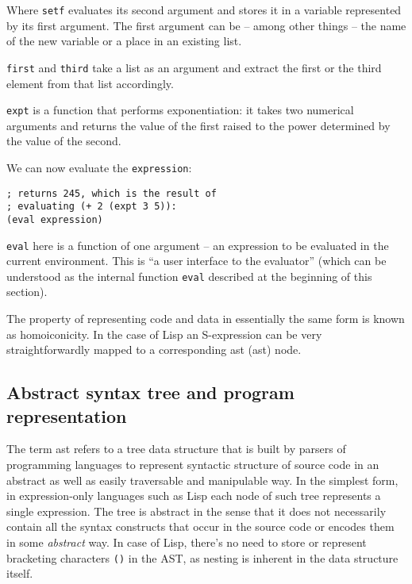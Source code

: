 Where \texttt{setf} evaluates its second argument and stores it in a variable represented by its first argument. The first argument can be -- among other things\cite[Section~11.15.1]{emacs_lisp_reference} -- the name of the new variable or a place in an existing list. 

\texttt{first} and \texttt{third} take a list as an argument and extract the first or the third element from that list accordingly.

\texttt{expt} is a function that performs exponentiation: it takes two numerical arguments and returns the value of the first raised to the power determined by the value of the second.

We can now evaluate the \texttt{expression}:
\begin{lstlisting}
; returns 245, which is the result of
; evaluating (+ 2 (expt 3 5)):
(eval expression)
\end{lstlisting}

\texttt{eval} here is a function of one argument -- an expression to be evaluated in the current environment. This is ``a user interface to the evaluator''\cite[Section~3.8, Function~EVAL]{common_lisp_hyperspec} (which can be understood as the internal function \texttt{eval} described at the beginning of this section).

The property of representing code and data in essentially the same form is known as homoiconicity\cite{homoiconicity_wikipedia, c2_homoiconicity, homoiconicity}. In the case of Lisp an S-expression can be very straightforwardly mapped to a corresponding \acrlong{ast} (\acrshort{ast}) node.


\subsection{Abstract syntax tree and program representation}
The term \acrshort{ast} refers to a tree data structure that is built
by parsers of programming languages to represent syntactic structure of source
code in an abstract as well as easily traversable and manipulable way. In the simplest form, in expression-only languages such as Lisp each node of such tree
represents a single expression. The tree is abstract in the sense that it does
not necessarily contain all the syntax constructs that occur in the source code
or encodes them in some \textit{abstract} way. In case of Lisp, there's no need to store or represent bracketing characters \texttt{()} in the AST, as nesting is inherent in the data structure itself.


